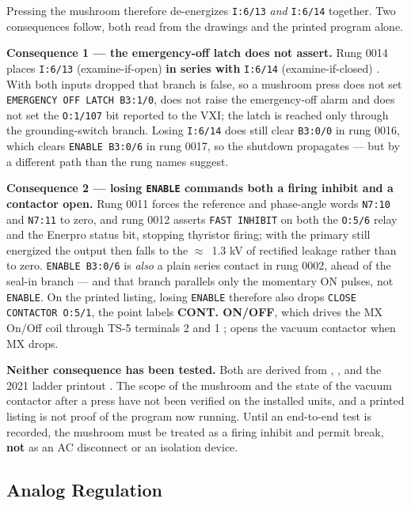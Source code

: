 Pressing the mushroom therefore de-energizes \texttt{I:6/13} \emph{and} \texttt{I:6/14} together. Two consequences follow, both read from the drawings and the printed program alone.

\textbf{Consequence 1 --- the emergency-off latch does not assert.} Rung 0014 places \texttt{I:6/13} (examine-if-open) \textbf{in series with} \texttt{I:6/14} (examine-if-closed) . With both inputs dropped that branch is false, so a mushroom press does not set \texttt{EMERGENCY OFF LATCH B3:1/0}, does not raise the emergency-off alarm and does not set the \texttt{O:1/107} bit reported to the VXI; the latch is reached only through the grounding-switch branch. Losing \texttt{I:6/14} does still clear \texttt{B3:0/0} in rung 0016, which clears \texttt{ENABLE B3:0/6} in rung 0017, so the shutdown propagates --- but by a different path than the rung names suggest.

\textbf{Consequence 2 --- losing \texttt{ENABLE} commands both a firing inhibit and a contactor open.} Rung 0011 forces the reference and phase-angle words \texttt{N7:10} and \texttt{N7:11} to zero, and rung 0012 asserts \texttt{FAST INHIBIT} on both the \texttt{O:5/6} relay and the Enerpro status bit, stopping thyristor firing; with the primary still energized the output then falls to the $\approx$~1.3 kV of rectified leakage  rather than to zero. \texttt{ENABLE B3:0/6} is \emph{also} a plain series contact in rung 0002, ahead of the seal-in branch --- and that branch parallels only the momentary ON pulses, not \texttt{ENABLE}. On the printed listing, losing \texttt{ENABLE} therefore also drops \texttt{CLOSE CONTACTOR O:5/1}, the point  labels \textbf{CONT. ON/OFF}, which drives the MX On/Off coil through TS-5 terminals 2 and 1 ;  opens the vacuum contactor when MX drops.

\begin{keynote}
\textbf{Neither consequence has been tested.} Both are derived from , ,  and the 2021 ladder printout . The scope of the mushroom and the state of the vacuum contactor after a press have not been verified on the installed units, and a printed listing is not proof of the program now running. Until an end-to-end test is recorded, the mushroom must be treated as a firing inhibit and permit break, \textbf{not} as an AC disconnect or an isolation device.
\end{keynote}


\subsection{Analog Regulation}\label{sec:analog-regulation}

